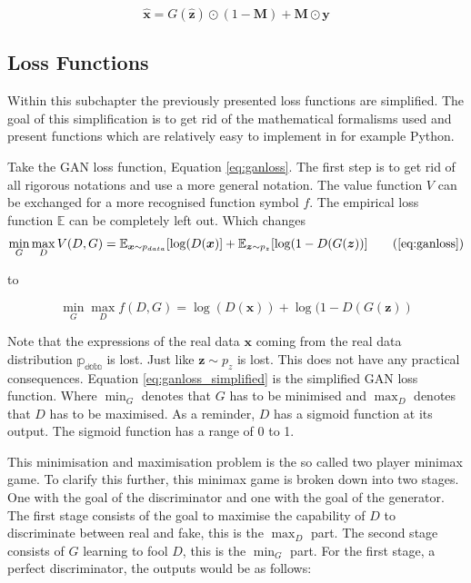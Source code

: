 \begin{equation}
    \boldsymbol{\hat{x}} = G(\boldsymbol{\hat{z}}) \odot (1-\boldsymbol{M})+\boldsymbol{M}\odot \boldsymbol{y}
\end{equation}







\subsection{Loss Functions} \label{lossfunctions_subchapter}
Within this subchapter the previously presented loss functions are simplified. The goal of this simplification is to get rid of the mathematical formalisms used and present functions which are relatively easy to implement in for example Python.

Take the GAN loss function, Equation \ref{eq:ganloss}. The first step is to get rid of all rigorous notations and use a more general notation. The value function $V$ can be exchanged for a more recognised function symbol $f$. The empirical loss function $\mathbb{E}$ can be completely left out. Which changes
\begin{equation}
    \min_{G} \max_{D} V(D,G) = \mathbb{E}_{\boldsymbol{x} \sim p_{data}} [\log(D(\boldsymbol{x})] + \mathbb{E}_{\boldsymbol{z} \sim p_{z}} [\log(1-D(G(\boldsymbol{z}))]
    \tag{\ref{eq:ganloss}}
\end{equation}

to 

\begin{equation}
    \min_{G} \max_{D} f(D,G) = \log(D(\boldsymbol{x})) + \log(1-D(G(\boldsymbol{z}))
    \label{eq:ganloss_simplified}
\end{equation}

Note that the expressions of the real data $\boldsymbol{x}$ coming from the real data distribution $\mathbb{p_{data}}$ is lost. Just like $\boldsymbol{z} \sim p_{z}$ is lost. This does not have any practical consequences. Equation \ref{eq:ganloss_simplified} is the simplified GAN loss function. Where $\min_{G}$ denotes that $G$ has to be minimised and $\max_{D}$ denotes that $D$ has to be maximised. As a reminder, $D$ has a sigmoid function at its output. The sigmoid function has a range of 0 to 1.

This minimisation and maximisation problem is the so called two player minimax game. To clarify this further, this minimax game is broken down into two stages. One with the goal of the discriminator and one with the goal of the generator. The first stage consists of the goal to maximise the capability of $D$ to discriminate between real and fake, this is the $\max_{D}$ part. The second stage consists of $G$ learning to fool $D$, this is the $\min_{G}$ part. For the first stage, a perfect discriminator, the outputs would be as follows:
    
